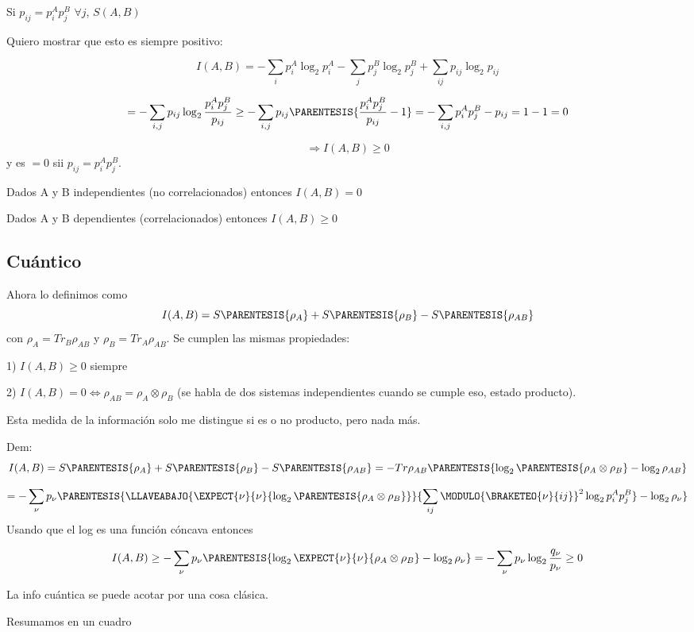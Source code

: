 Si $p_{ij}=p_{i}^{A}p_{j}^{B}$ $\forall j$, $S(A,B)$

Quiero mostrar que esto es siempre positivo:

\[
I(A,B)=-\sum_{i}p_{i}^{A}\log_{2}p_{i}^{A}-\sum_{j}p_{j}^{B}\log_{2}p_{j}^{B}+\sum_{ij}p_{ij}\log_{2}p_{ij}
\]

\[
=-\sum_{i,j}p_{ij}\log_{2}\frac{p_{i}^{A}p_{j}^{B}}{p_{ij}}\geq-\sum_{i,j}p_{ij}\PARENTESIS{\frac{p_{i}^{A}p_{j}^{B}}{p_{ij}}-1}=-\sum_{i,j}p_{i}^{A}p_{j}^{B}-p_{ij}=1-1=0
\]

\[
\Rightarrow I(A,B)\geq0
\]
y es $=0$ sii $p_{ij}=p_{i}^{A}p_{j}^{B}$.

Dados A y B independientes (no correlacionados) entonces $I(A,B)=0$

Dados A y B dependientes (correlacionados) entonces $I(A,B)\geq0$

\subsection{Cuántico}

Ahora lo definimos como 
\[
I(A,B)=S\PARENTESIS{\rho_{A}}+S\PARENTESIS{\rho_{B}}-S\PARENTESIS{\rho_{AB}}
\]
con $\rho_{A}=Tr_{B}\rho_{AB}$ y $\rho_{B}=Tr_{A}\rho_{AB}$. Se
cumplen las mismas propiedades:

1) $I(A,B)\geq0$ siempre

2) $I(A,B)=0\iff\rho_{AB}=\rho_{A}\otimes\rho_{B}$ (se habla de dos
sistemas independientes cuando se cumple eso, estado producto). 

Esta medida de la información solo me distingue si es o no producto,
pero nada más.

Dem: 
\[
I(A,B)=S\PARENTESIS{\rho_{A}}+S\PARENTESIS{\rho_{B}}-S\PARENTESIS{\rho_{AB}}=-Tr\rho_{AB}\PARENTESIS{\log_{2}\PARENTESIS{\rho_{A}\otimes\rho_{B}}-\log_{2}\rho_{AB}}
\]

\[
=-\sum_{\nu}p_{\nu}\PARENTESIS{\LLAVEABAJO{\EXPECT{\nu}{\nu}{\log_{2}\PARENTESIS{\rho_{A}\otimes\rho_{B}}}}{\sum_{ij}\MODULO{\BRAKETEO{\nu}{ij}}^{2}\log_{2}p_{i}^{A}p_{j}^{B}}-\log_{2}\rho_{\nu}}
\]
Usando que el log es una función cóncava entonces 

\[
I(A,B)\ge-\sum_{\nu}p_{\nu}\PARENTESIS{\log_{2}\EXPECT{\nu}{\nu}{\rho_{A}\otimes\rho_{B}}-\log_{2}\rho_{\nu}}=-\sum_{\nu}p_{\nu}\log_{2}\frac{q_{\nu}}{p_{\nu}}\geq0
\]

La info cuántica se puede acotar por una cosa clásica.

Resumamos en un cuadro

